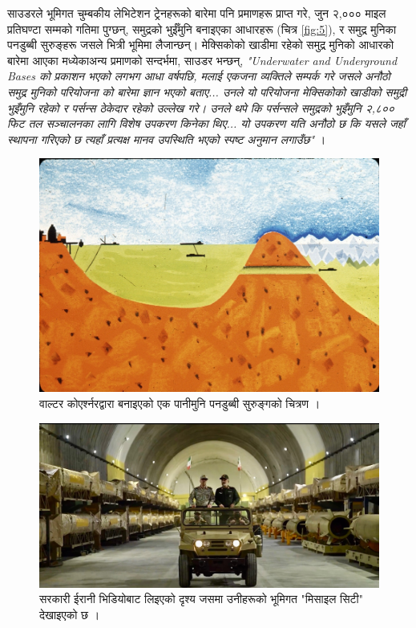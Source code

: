 \documentclass[10pt,twocolumn,letterpaper]{article}
\begin{document}
साउडरले भूमिगत चुम्बकीय लेभिटेशन ट्रेनहरूको बारेमा पनि प्रमाणहरू प्राप्त गरे, जुन २,००० माइल प्रतिघण्टा सम्मको गतिमा पुग्छन्, समुद्रको भुईँमुनि बनाइएका आधारहरू (चित्र \ref{fig:5}), र समुद्र मुनिका पनडुब्बी सुरुङ्हरू जसले भित्री भूमिमा लैजान्छन्। मेक्सिकोको खाडीमा रहेको समुद्र मुनिको आधारको बारेमा आएका मध्येकाअन्य प्रमाणको सन्दर्भमा, साउडर भन्छन्, \textit{"Underwater and Underground Bases को प्रकाशन भएको लगभग आधा वर्षपछि, मलाई एकजना व्यक्तिले सम्पर्क गरे जसले अनौठो समुद्र मुनिको परियोजना को बारेमा ज्ञान भएको बताए... उनले यो परियोजना मेक्सिकोको खाडीको समुद्री भुइँमुनि रहेको र पर्सन्स ठेकेदार रहेको उल्लेख गरे। उनले थपे कि पर्सन्सले समुद्रको भुइँमुनि २,८०० फिट तल सञ्चालनका लागि विशेष उपकरण किनेका थिए... यो उपकरण यति अनौठो छ कि यसले जहाँ स्थापना गरिएको छ त्यहाँ प्रत्यक्ष मानव उपस्थिति भएको स्पष्ट अनुमान लगाउँछ"} \cite{22}।
\begin{figure}[t]
\begin{center}
   \includegraphics[width=1\linewidth]{sub.jpg}
\end{center}
   \caption{वाल्टर कोएर्श्नरद्वारा बनाइएको एक पानीमुनि पनडुब्बी सुरुङ्गको चित्रण \cite{22,23}।}
\label{fig:6}
\label{fig:onecol}
\end{figure}
\begin{figure}[t]
\begin{center}
   \includegraphics[width=1\linewidth]{iran.jpeg}
\end{center}
   \caption{सरकारी ईरानी भिडियोबाट लिइएको दृश्य जसमा उनीहरूको भूमिगत "मिसाइल सिटी" देखाइएको छ \cite{39,40}।}
\label{fig:12}
\label{fig:onecol}
\end{figure}
\end{document}
